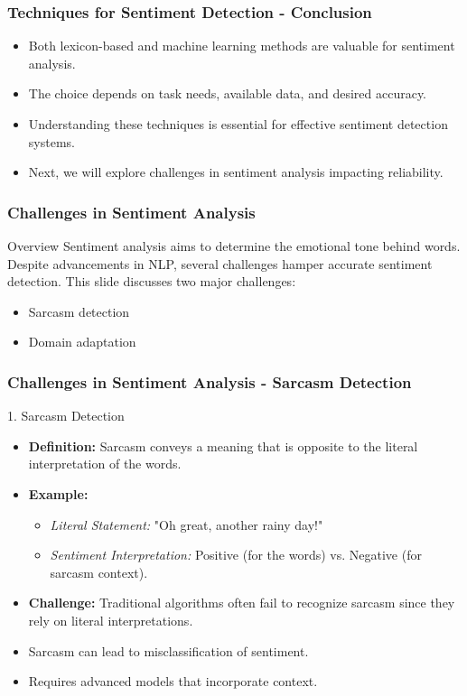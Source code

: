 \documentclass[aspectratio=169]{beamer}
\begin{document}
\begin{frame}
    \frametitle{Techniques for Sentiment Detection - Conclusion}
    \begin{itemize}
        \item Both lexicon-based and machine learning methods are valuable for sentiment analysis.
        \item The choice depends on task needs, available data, and desired accuracy.
        \item Understanding these techniques is essential for effective sentiment detection systems.
        \item Next, we will explore challenges in sentiment analysis impacting reliability.
    \end{itemize}
\end{frame}

\begin{frame}[fragile]
    \frametitle{Challenges in Sentiment Analysis}
    \begin{block}{Overview}
        Sentiment analysis aims to determine the emotional tone behind words. Despite advancements in NLP, several challenges hamper accurate sentiment detection. This slide discusses two major challenges: 
        \begin{itemize}
            \item Sarcasm detection
            \item Domain adaptation
        \end{itemize}
    \end{block}
\end{frame}

\begin{frame}[fragile]
    \frametitle{Challenges in Sentiment Analysis - Sarcasm Detection}
    \begin{block}{1. Sarcasm Detection}
        \begin{itemize}
            \item \textbf{Definition:} Sarcasm conveys a meaning that is opposite to the literal interpretation of the words.
            \item \textbf{Example:} 
            \begin{itemize}
                \item \textit{Literal Statement:} "Oh great, another rainy day!" 
                \item \textit{Sentiment Interpretation:} Positive (for the words) vs. Negative (for sarcasm context).
            \end{itemize}
            \item \textbf{Challenge:} Traditional algorithms often fail to recognize sarcasm since they rely on literal interpretations.
        \end{itemize}
    \end{block}
    \begin{itemize}
        \item Sarcasm can lead to misclassification of sentiment.
        \item Requires advanced models that incorporate context.
    \end{itemize}
\end{frame}
\end{document}
